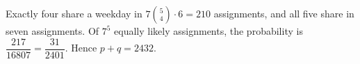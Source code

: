 Exactly four share a weekday in $7\binom54\cdot6=210$ assignments, and all five share in seven assignments. Of $7^5$ equally likely assignments, the probability is $\dfrac{217}{16807}=\dfrac{31}{2401}$. Hence $p+q=\boxed{2432}$.
